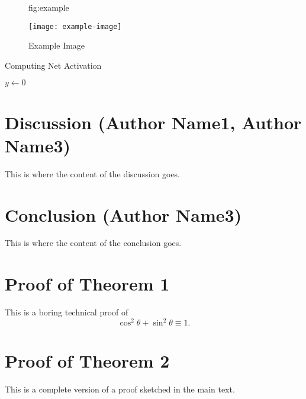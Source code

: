 \documentclass{MLIA} %
\begin{document}
\begin{figure}[htbp]
\floatconts
  {fig:example}
  {\caption{Example Image}}
  {\texttt{[image: example-image]}}
\end{figure}

\begin{algorithm2e}
\caption{Computing Net Activation}
\label{alg:net}
{}
$y\leftarrow 0$\;
\end{algorithm2e}
\section{Discussion (Author Name1, Author Name3)}
This is where the content of the discussion goes.  
\section{Conclusion (Author Name3)}
This is where the content of the conclusion goes.  



\appendix

\section{Proof of Theorem 1}

This is a boring technical proof of
\begin{equation}\label{eq:example}
\cos^2\theta + \sin^2\theta \equiv 1.
\end{equation}

\section{Proof of Theorem 2}

This is a complete version of a proof sketched in the main text.
\end{document}
